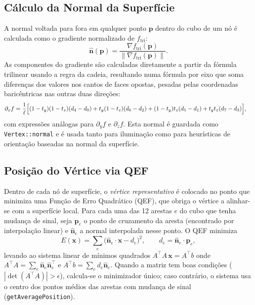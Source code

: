 \documentclass[10pt,a4paper]{article}
\begin{document}
\subsection{Cálculo da Normal da Superfície}
\label{sec:sdf:normal}

A normal voltada para fora em qualquer ponto $\mathbf{p}$ dentro do
cubo de um nó é calculada como o gradiente normalizado de
$f_{\text{tri}}$:
\[
  \hat{\mathbf{n}}(\mathbf{p}) =
    \frac{\nabla f_{\text{tri}}(\mathbf{p})}
         {\|\nabla f_{\text{tri}}(\mathbf{p})\|}.
\]
As componentes do gradiente são calculadas diretamente a partir da
fórmula trilinear usando a regra da cadeia, resultando numa fórmula
por eixo que soma diferenças dos valores nos cantos de faces opostas,
pesadas pelas coordenadas baricêntricas nas outras duas direções:
\begin{align*}
  \partial_x f &= \frac{1}{\ell}\Bigl[
    (1-t_y)(1-t_z)(d_4-d_0) + t_y(1-t_z)(d_6-d_2) +
    (1-t_y)t_z(d_5-d_1) + t_y t_z(d_7-d_3)
  \Bigr],
\end{align*}
com expressões análogas para $\partial_y f$ e $\partial_z f$. Esta
normal é guardada como \lstinline{Vertex::normal} e é usada tanto
para iluminação como para heurísticas de orientação baseadas na
normal da superfície.

\subsection{Posição do Vértice via QEF}
\label{sec:sdf:qef}

Dentro de cada nó de superfície, o \emph{vértice representativo} é
colocado no ponto que minimiza uma Função de Erro Quadrático (QEF),
que obriga o vértice a alinhar-se com a superfície local. Para cada
uma das 12 arestas $e$ do cubo que tenha mudança de sinal, seja
$\mathbf{p}_e$ o ponto de cruzamento da aresta (encontrado por
interpolação linear) e $\hat{\mathbf{n}}_e$ a normal interpolada
nesse ponto. O QEF minimiza
\[
  E(\mathbf{x}) = \sum_e \bigl(\hat{\mathbf{n}}_e \cdot \mathbf{x} - d_e\bigr)^2,
  \qquad d_e = \hat{\mathbf{n}}_e \cdot \mathbf{p}_e,
\]
levando ao sistema linear de mínimos quadrados
$A^\top\!A\,\mathbf{x} = A^\top b$ onde
$A^\top\!A = \sum_e \hat{\mathbf{n}}_e\hat{\mathbf{n}}_e^\top$ e
$A^\top b = \sum_e d_e\hat{\mathbf{n}}_e$. Quando a matriz tem boas
condições ($|\det(A^\top\!A)| > \epsilon$), calcula-se o minimizador
único; caso contrário, o sistema usa o centro dos pontos médios das
arestas com mudança de sinal (\lstinline{getAveragePosition}).
\end{document}
